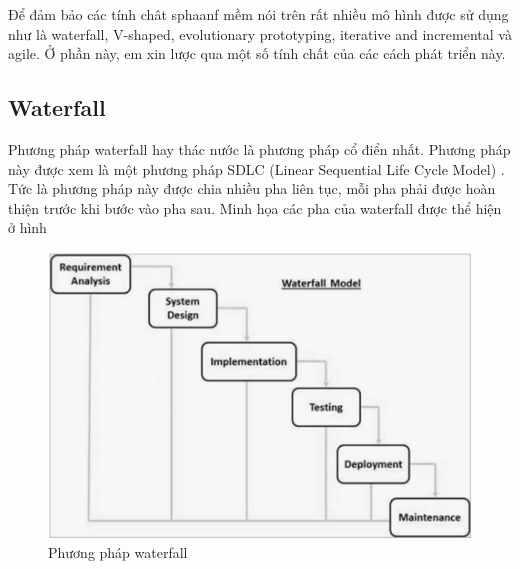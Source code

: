 \documentclass{article}
\begin{document}
	Để đảm bảo các tính chât sphaanf mềm nói trên rất nhiều mô hình được sử dụng như là waterfall, V-shaped, evolutionary prototyping, iterative and incremental và agile. Ở phần này, em xin lược qua một số tính chất của các cách phát triển này.
	
	\subsection{Waterfall}
	
	Phương pháp waterfall hay thác nước là phương pháp cổ điển nhất. Phương pháp này được xem là một phương pháp SDLC (Linear Sequential Life Cycle Model) \cite{tutorialspoint}. Tức là phương pháp này được chia nhiều pha liên tục, mỗi pha phải được hoàn thiện trước khi bước vào pha sau. Minh họa các pha của waterfall được thể hiện ở hình 
	
	\begin{figure}[h]
		\centering
		\includegraphics[scale=0.3]{figures/waterfall.png}
		\caption{Phương pháp waterfall \cite{tutorialspoint}}
		\label{fig:waterfall}
	\end{figure}
	
\end{document}
